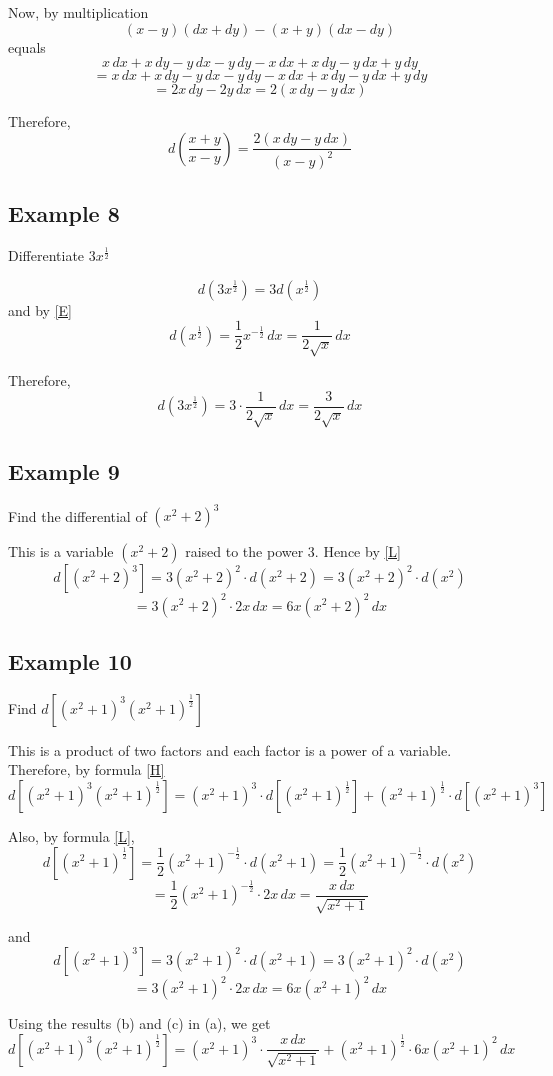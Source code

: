 Now, by multiplication
\[(x-y)(dx+dy) - (x+y)(dx-dy)\]
equals
\[x\,dx + x\,dy - y\,dx - y\,dy - x\,dx + x\,dy - y\,dx + y\,dy\]
\[= x\,dx + x\,dy - y\,dx - y\,dy - x\,dx + x\,dy - y\,dx + y\,dy\]
\[= 2x\,dy - 2y\,dx = 2(x\,dy - y\,dx)\]

Therefore,
\[d(\frac{x+y}{x-y}) = \frac{2(x\,dy - y\,dx)}{(x-y)^2}\]

\subsection*{Example 8}
Differentiate $3x^{\frac{1}{2}}$

\[d(3x^{\frac{1}{2}}) = 3d(x^{\frac{1}{2}})\]
and by \eqref{E}
\[d(x^{\frac{1}{2}}) = \frac{1}{2}x^{-\frac{1}{2}}\,dx = \frac{1}{2\sqrt{x}}\,dx\]

Therefore,
\[d(3x^{\frac{1}{2}}) = 3\cdot\frac{1}{2\sqrt{x}}\,dx = \frac{3}{2\sqrt{x}}\,dx\]

\subsection*{Example 9}
Find the differential of $(x^2+2)^3$

This is a variable $(x^2+2)$ raised to the power 3. Hence by \eqref{L}
\[d[(x^2+2)^3] = 3(x^2+2)^2\cdot d(x^2+2) = 3(x^2+2)^2\cdot d(x^2)\]
\[= 3(x^2+2)^2\cdot 2x\,dx = 6x(x^2+2)^2\,dx\]

\subsection*{Example 10}
Find $d[(x^2+1)^3(x^2+1)^{\frac{1}{2}}]$

This is a product of two factors and each factor is a power of a variable. Therefore, by formula \eqref{H}
\[d[(x^2+1)^3(x^2+1)^{\frac{1}{2}}] = (x^2+1)^3\cdot d[(x^2+1)^{\frac{1}{2}}] + (x^2+1)^{\frac{1}{2}}\cdot d[(x^2+1)^3] \tag{a} \label{a}\]

Also, by formula \eqref{L},
\[d[(x^2+1)^{\frac{1}{2}}] = \frac{1}{2}(x^2+1)^{-\frac{1}{2}}\cdot d(x^2+1) = \frac{1}{2}(x^2+1)^{-\frac{1}{2}}\cdot d(x^2)\]
\[= \frac{1}{2}(x^2+1)^{-\frac{1}{2}}\cdot 2x\,dx = \frac{x\,dx}{\sqrt{x^2+1}} \tag{b} \label{b}\]

and
\[d[(x^2+1)^3] = 3(x^2+1)^2\cdot d(x^2+1) = 3(x^2+1)^2\cdot d(x^2)\]
\[= 3(x^2+1)^2\cdot 2x\,dx = 6x(x^2+1)^2\,dx \tag{c} \label{c}\]

Using the results (b) and (c) in (a), we get
\[d[(x^2+1)^3(x^2+1)^{\frac{1}{2}}] = (x^2+1)^3\cdot\frac{x\,dx}{\sqrt{x^2+1}} + (x^2+1)^{\frac{1}{2}}\cdot 6x(x^2+1)^2\,dx\]

